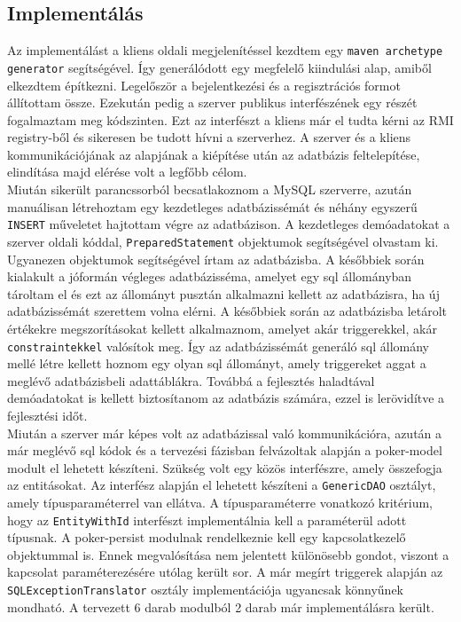 \subsection{Implementálás}
Az implementálást a kliens oldali megjelenítéssel kezdtem egy \texttt{maven archetype generator} segítségével. Így generálódott egy megfelelő kiindulási alap, amiből elkezdtem építkezni. Legelőször a bejelentkezési és a regisztrációs formot állítottam össze. Ezekután pedig a szerver publikus interfészének egy részét fogalmaztam meg kódszinten. Ezt az interfészt a kliens már el tudta kérni az RMI registry-ből \cite{RMI} és sikeresen be tudott hívni a szerverhez. A szerver és a kliens kommunikációjának az alapjának a kiépítése után az adatbázis feltelepítése, elindítása majd elérése volt a legfőbb célom. \\
Miután sikerült parancssorból becsatlakoznom a MySQL szerverre, azután manuálisan létrehoztam egy kezdetleges adatbázissémát és néhány egyszerű \texttt{INSERT} műveletet hajtottam végre az adatbázison. A kezdetleges demóadatokat a szerver oldali kóddal, \texttt{PreparedStatement} objektumok segítségével olvastam ki. Ugyanezen objektumok segítségével írtam az adatbázisba. A későbbiek során kialakult a jóformán végleges adatbázisséma, amelyet egy sql állományban tároltam el és ezt az állományt pusztán alkalmazni kellett az adatbázisra, ha új adatbázissémát szerettem volna elérni. A későbbiek során az adatbázisba letárolt értékekre megszorításokat kellett alkalmaznom, amelyet akár triggerekkel, akár \texttt{constraintekkel} valósítok meg. Így az adatbázissémát generáló sql állomány mellé létre kellett hoznom egy olyan sql állományt, amely triggereket aggat a meglévő adatbázisbeli adattáblákra. Továbbá a fejlesztés haladtával demóadatokat is kellett biztosítanom az adatbázis számára, ezzel is lerövidítve a fejlesztési időt. \\
Miután a szerver már képes volt az adatbázissal való kommunikációra, azután a már meglévő sql kódok és a tervezési fázisban felvázoltak alapján a poker-model modult el lehetett készíteni. Szükség volt egy közös interfészre, amely összefogja az entitásokat. Az interfész alapján el lehetett készíteni a \texttt{GenericDAO} osztályt, amely típusparaméterrel van ellátva. A típusparaméterre vonatkozó kritérium, hogy az \texttt{EntityWithId} interfészt implementálnia kell a paraméterül adott típusnak. A poker-persist modulnak rendelkeznie kell egy kapcsolatkezelő objektummal is. Ennek megvalósítása nem jelentett különösebb gondot, viszont a kapcsolat paraméterezésére utólag került sor. A már megírt triggerek alapján az \texttt{SQLExceptionTranslator} osztály implementációja ugyancsak könnyűnek mondható. A tervezett 6 darab modulból 2 darab már implementálásra került. \\
